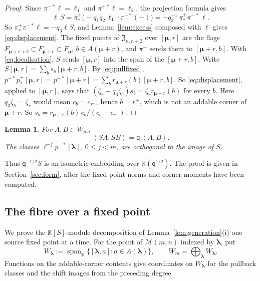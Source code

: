\documentclass[11pt]{amsart}
\newtheorem{lemma}[theorem]{Lemma}
\theoremstyle{definition}
\theoremstyle{remark}
\newcommand{\Mq}{\mathsf q}                      %
\newcommand{\K}{\mathbb K}                       %
\newcommand{\bl}{{\boldsymbol{\lambda}}}         %
\newcommand{\bmu}{{\boldsymbol{\mu}}}
\newcommand{\Add}[1]{A(#1)}                      %
\newcommand{\bwt}[1]{\zeta_{#1}}                 %
\newcommand{\res}[2]{r_{#1}(#2)}                 %
\newcommand{\ip}[2]{\left\langle #1,#2\right\rangle}
\newcommand{\ceig}[1]{c_{#1}}                    %
\newcommand{\bplus}[1]{{#1}^{+}}                 %
\newcommand{\Wfib}[1]{W_{#1}}                    %
\newcommand{\Gies}[2]{\mathcal M(#1,#2)}         %
\newcommand{\Zc}{\mathfrak Z}
\newcommand{\HeckeTwo}[1]{\Zc_{#1,#1+2}}         %
\newcommand{\Sh}{F}                              %
\newcommand{\Fsh}[1]{\Sh_{#1}}                   %
\newcommand{\Wsp}[1]{W_{#1}}                     %
\newcommand{\fix}[1]{[#1]}                       %
\newcommand{\pt}[2]{[#1,#2]}                     %
\newcommand{\taut}{\ell}                         %
\newcommand{\tautone}{\ell_1}
\newcommand{\tauttwo}{\ell_2}
\newcommand{\pulm}{p^{-*}}                       %
\newcommand{\pushp}{p^+_*}                       %
\newcommand{\pip}{\pi^+}                         %
\newcommand{\pimpull}{\pi^{-*}}                  %
\newcommand{\pippush}{\pi^+_*}                   %
\newcommand{\pippull}{\pi^{+*}}                  %
\newcommand{\Shift}{S}                           %
\begin{document}
\begin{proof}
Since \(\pimpull\taut=\tautone\) and \(\pippull\taut=\tauttwo\), the projection formula gives
\[
 \taut\,\Shift=\pippush\bigl(-q_1q_2\,\tautone\cdot\pimpull(-)\bigr)
 =-q_3^{-1}\,\pippush\pimpull\,\taut .
\]
So \(\pippush\pimpull\taut=-q_3\taut\Shift\), and Lemma~\ref{lem:excess}
composed with \(\taut\) gives \eqref{eq:displacement}. The fixed points of \(\HeckeTwo{n}\) over
\(\pt{\bmu}{r}\) are the flags \(\Fsh{\bmu+r+b}\subset\Fsh{\bmu+r}\subset\Fsh{\bmu}\),
\(b\in\Add{\bmu+r}\), and \(\pip\) sends them to \(\pt{\bmu+r}{b}\). With \eqref{eq:localisation},
\(\Shift\) sends \(\pt{\bmu}{r}\) into the span of the \(\pt{\bmu+r}{b}\).
Write \(\Shift\pt{\bmu}{r}=\sum_bs_b\pt{\bmu+r}{b}\). By \eqref{eq:pullfixed},
\(\pulm\pushp\pt{\bmu}{r}=\pulm\fix{\bmu+r}=\sum_b\res{\bmu+r}{b}\pt{\bmu+r}{b}\). So
\eqref{eq:displacement}, applied to \(\pt{\bmu}{r}\), says that
\((\bwt{r}-q_3\bwt{b})s_b=\bwt{r}\res{\bmu+r}{b}\) for every \(b\). Here \(q_3\bwt{b}=\bwt{r}\) would
mean \(\ceig{b}=\ceig{\bplus{r}}\), hence \(b=\bplus{r}\), which is not an addable corner of
\(\bmu+r\). So \(s_b=\res{\bmu+r}{b}\,\ceig{b}/(\ceig{b}-\ceig{\bplus{r}})\).
\end{proof}

\begin{lemma}\label{lem:shiftip}
For \(A,B\in\Wsp{m}\),
\[
 \ip{\Shift A}{\Shift B}=\Mq\,\ip{A}{B}.
\]
The classes \(\taut^{-j}\pulm\fix{\bl}\), \(0\leq j<m\), are orthogonal
to the image of \(\Shift\).
\end{lemma}

Thus \(\Mq^{-1/2}\Shift\) is an isometric embedding over \(\K(\Mq^{1/2})\).
The proof is given in Section~\ref{sec:form}, after the fixed-point norms and
corner moments have been computed.

\subsection{The fibre over a fixed point}\label{sec:fibre}

We prove the \(\K[\Shift]\)-module decomposition of Lemma~\ref{lem:generation}(i)
one source fixed point at a time. For the point of \(\Gies{m}{n}\) indexed by \(\bl\), put
\[
 \Wfib{\bl}:=\operatorname{span}_{\K}\{\pt{\bl}{a}:a\in\Add{\bl}\},
 \qquad \Wsp{m}=\bigoplus_\bl\Wfib{\bl}.
\]
Functions on the addable-corner contents give coordinates on \(\Wfib{\bl}\)
for the pullback classes and the shift images from the preceding degree.
\end{document}
